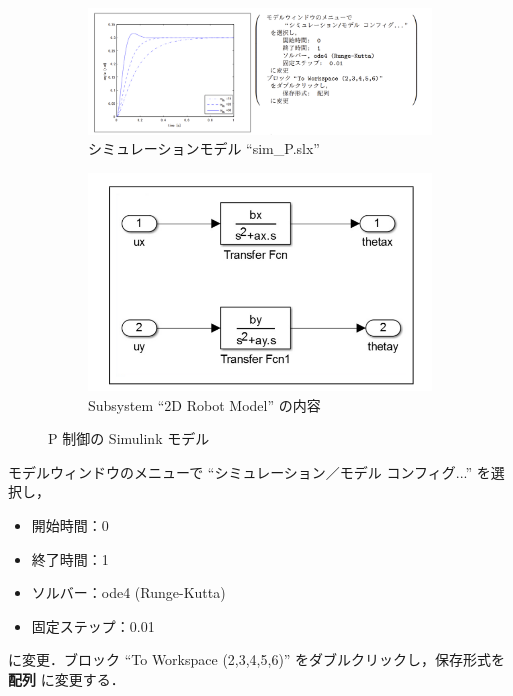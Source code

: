 \begin{figure}[htbp]
    \centering
    \begin{subfigure}[b]{0.45\linewidth}
        \centering
        \includegraphics[width=\linewidth]{figure/sim_result_omega.png}
        \caption{シミュレーションモデル ``sim\_P.slx''}
    \end{subfigure}
    \hfill
    \begin{subfigure}[b]{0.45\linewidth}
        \centering
        \includegraphics[width=\linewidth]{figure/sim_model_block.png}
        \caption{Subsystem ``2D Robot Model'' の内容}
    \end{subfigure}
    \caption{P 制御の Simulink モデル}
    \label{fig:sim_param}
\end{figure}

\noindent
モデルウィンドウのメニューで ``シミュレーション／モデル コンフィグ...'' を選択し，
\begin{itemize}
  \item 開始時間：0
  \item 終了時間：1
  \item ソルバー：ode4 (Runge-Kutta)
  \item 固定ステップ：0.01
\end{itemize}
に変更．ブロック ``To Workspace (2,3,4,5,6)'' をダブルクリックし，保存形式を \textbf{配列} に変更する．

